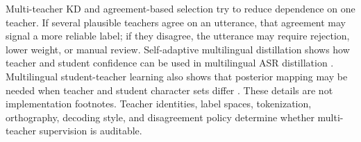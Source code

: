 \documentclass[pdflatex,sn-basic]{sn-jnl}
\theoremstyle{thmstyleone}
\theoremstyle{thmstyletwo}
\theoremstyle{thmstylethree}
\begin{document}
Multi-teacher KD and agreement-based selection try to reduce dependence on one teacher. If several plausible teachers agree on an utterance, that agreement may signal a more reliable label; if they disagree, the utterance may require rejection, lower weight, or manual review. Self-adaptive multilingual distillation shows how teacher and student confidence can be used in multilingual ASR distillation \citep{leal21_interspeech}. Multilingual student-teacher learning also shows that posterior mapping may be needed when teacher and student character sets differ \citep{farooq2023must}. These details are not implementation footnotes. Teacher identities, label spaces, tokenization, orthography, decoding style, and disagreement policy determine whether multi-teacher supervision is auditable.

\end{document}
